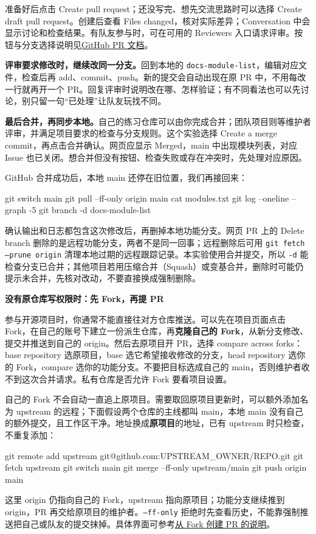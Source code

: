 \begin{example}
准备好后点击 Create pull request；还没写完、想先交流思路时可以选择 Create draft pull request。创建后查看 Files changed，核对实际差异；Conversation 中会显示讨论和检查结果。有队友参与时，可在可用的 Reviewers 入口请求评审。按钮与分支选择说明见\href{https://docs.github.com/en/pull-requests/how-tos/create-pull-requests/creating-a-pull-request}{GitHub PR 文档}。

\textbf{评审要求修改时，继续改同一分支。}回到本地的 \texttt{docs-module-list}，编辑对应文件，检查后再 add、commit、push。新的提交会自动出现在原 PR 中，不用每改一行就再开一个 PR。回复评审时说明改在哪、怎样验证；有不同看法也可以先讨论，别只留一句“已处理”让队友玩找不同。

\textbf{最后合并，再同步本地。}自己的练习仓库可以由你完成合并；团队项目则等维护者评审，并满足项目要求的检查与分支规则。这个实验选择 Create a merge commit，再点击合并确认。网页应显示 Merged，main 中出现模块列表，对应 Issue 也已关闭。想合并但没有按钮、检查失败或存在冲突时，先处理对应原因。

GitHub 合并成功后，本地 main 还停在旧位置，我们再接回来：
\begin{tbash}
git switch main
git pull --ff-only origin main
cat modules.txt
git log --oneline --graph -5
git branch -d docs-module-list
\end{tbash}
确认输出和日志都包含这次修改后，再删掉本地功能分支。网页 PR 上的 Delete branch 删除的是远程功能分支，两者不是同一回事；远程删除后可用 \texttt{git fetch --prune origin} 清理本地过期的远程跟踪记录。本实验使用合并提交，所以 \texttt{-d} 能检查分支已合并；其他项目若用压缩合并（Squash）或变基合并，删除时可能仍提示未合并，先核对改动，不要直接换成强制删除。
\end{example}

\par\medskip\noindent\textbf{没有原仓库写权限时：先 Fork，再提 PR}\par
参与开源项目时，你通常不能直接往对方仓库推送。可以先在项目页面点击 Fork，在自己的账号下建立一份派生仓库，再\textbf{克隆自己的 Fork}，从新分支修改、提交并推送到自己的 origin。然后去原项目开 PR，选择 compare across forks：base repository 选原项目，base 选它希望接收修改的分支，head repository 选你的 Fork，compare 选你的功能分支。不要把目标选成自己的 main，否则维护者收不到这次合并请求。私有仓库是否允许 Fork 要看项目设置。

自己的 Fork 不会自动一直追上原项目。需要取回原项目更新时，可以额外添加名为 upstream 的远程；下面假设两个仓库的主线都叫 main，本地 main 没有自己的额外提交，且工作区干净。地址换成\textbf{原项目}的地址，已有 upstream 时只检查，不重复添加：
\begin{tbash}
git remote add upstream git@github.com:UPSTREAM_OWNER/REPO.git
git fetch upstream
git switch main
git merge --ff-only upstream/main
git push origin main
\end{tbash}
这里 origin 仍指向自己的 Fork，upstream 指向原项目；功能分支继续推到 origin，PR 再交给原项目的维护者。\texttt{--ff-only} 拒绝时先查看历史，不能靠强制推送把自己或队友的提交抹掉。具体界面可参考\href{https://docs.github.com/en/pull-requests/how-tos/create-pull-requests/creating-a-pull-request-from-a-fork}{从 Fork 创建 PR 的说明}。

